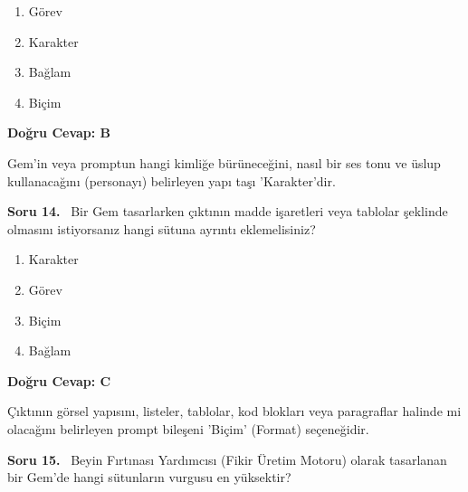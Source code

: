 \documentclass[11pt,a4paper,openany]{book}
\begin{document}
\begin{enumerate}[label=\Alph*), leftmargin=25pt, topsep=4pt, itemsep=2pt]
        \item Görev
        \item Karakter
        \item Bağlam
        \item Biçim
\end{enumerate}

\vspace{4pt}
\begin{tcolorbox}[title=Cevap ve Açıklama, colback=gray!3!white, colframe=primarycolor!90!black, arc=2mm, fonttitle=\bfseries\sffamily, top=6pt, bottom=6pt]
    \textbf{Doğru Cevap: B}

    \vspace{2pt}
    Gem'in veya promptun hangi kimliğe bürüneceğini, nasıl bir ses tonu ve üslup kullanacağını (personayı) belirleyen yapı taşı 'Karakter'dir.
\end{tcolorbox}
\vspace{10pt}
\needspace{5cm}
\vspace{8pt}
\noindent\textbf{\large\sffamily Soru 14.} \ Bir Gem tasarlarken çıktının madde işaretleri veya tablolar şeklinde olmasını istiyorsanız hangi sütuna ayrıntı eklemelisiniz?

\begin{enumerate}[label=\Alph*), leftmargin=25pt, topsep=4pt, itemsep=2pt]
        \item Karakter
        \item Görev
        \item Biçim
        \item Bağlam
\end{enumerate}

\vspace{4pt}
\begin{tcolorbox}[title=Cevap ve Açıklama, colback=gray!3!white, colframe=primarycolor!90!black, arc=2mm, fonttitle=\bfseries\sffamily, top=6pt, bottom=6pt]
    \textbf{Doğru Cevap: C}

    \vspace{2pt}
    Çıktının görsel yapısını, listeler, tablolar, kod blokları veya paragraflar halinde mi olacağını belirleyen prompt bileşeni 'Biçim' (Format) seçeneğidir.
\end{tcolorbox}
\vspace{10pt}
\needspace{5cm}
\vspace{8pt}
\noindent\textbf{\large\sffamily Soru 15.} \ Beyin Fırtınası Yardımcısı (Fikir Üretim Motoru) olarak tasarlanan bir Gem'de hangi sütunların vurgusu en yüksektir?
\end{document}
